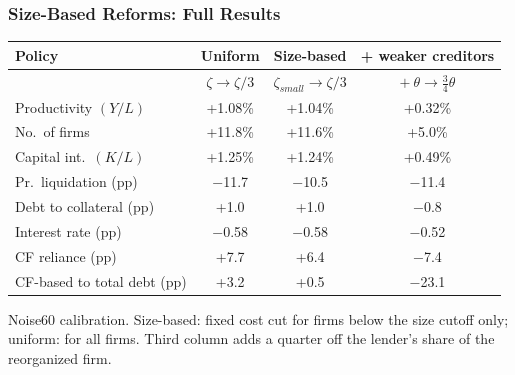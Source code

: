\documentclass[aspectratio=169,xcolor=table]{beamer}
\begin{document}
\begin{frame}[label=sbra_full] \frametitle{Size-Based Reforms: Full Results \hfill \hyperlink{rec}{}}

\small
\begin{table}[H]
    \centering
    \renewcommand{\arraystretch}{0.9}
    \begin{tabular}{lccc}
    \textbf{Policy} & \textbf{Uniform} & \textbf{Size-based} & \textbf{+ weaker creditors}\\
    \toprule
    & $\zeta \rightarrow \zeta/3$ & $\zeta_{small} \rightarrow \zeta/3$ & $+\ \theta \rightarrow \tfrac{3}{4}\theta$\\
    \midrule
    Productivity $(Y/L)$       & +1.08\% & +1.04\% & +0.32\%\\
    No.\ of firms              & +11.8\% & +11.6\% & +5.0\%\\
    Capital int.\ $(K/L)$      & +1.25\% & +1.24\% & +0.49\%\\
    Pr.\ liquidation (pp)      & $-$11.7 & $-$10.5 & $-$11.4\\
    Debt to collateral (pp)    & +1.0 & +1.0 & $-$0.8\\
    Interest rate (pp)         & $-$0.58 & $-$0.58 & $-$0.52\\
    CF reliance (pp)           & +7.7 & +6.4 & $-$7.4\\
    CF-based to total debt (pp) & +3.2 & +0.5 & $-$23.1\\
    \bottomrule
    \end{tabular}
\end{table}
\normalsize
\scriptsize Noise60 calibration. Size-based: fixed cost cut for firms below the size cutoff only; uniform: for all firms. Third column adds a quarter off the lender's share of the reorganized firm.

\end{frame}
\end{document}
